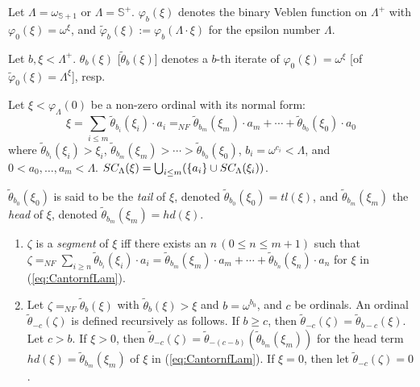 \documentclass{article}
\newcommand{\mS}{\mathbb{S}}
\begin{document}
\bdf\label{df:Lam}
{\rm
Let $\Lambda=\omega_{\mathbb{S}+1}$
or $\Lambda=\mS^{+}$.
$\varphi_{b}(\xi)$ denotes the binary Veblen function on 
$\Lambda^{+}$ with $\varphi_{0}(\xi)=\omega^{\xi}$, and
$\tilde{\varphi}_{b}(\xi):=\varphi_{b}(\Lambda\cdot \xi)$ for the epsilon number 
$\Lambda$.


Let $b,\xi<\Lambda^{+}$.
$\theta_{b}(\xi)$ [$\tilde{\theta}_{b}(\xi)$] denotes
a $b$-th iterate of $\varphi_{0}(\xi)=\omega^{\xi}$ [of $\tilde{\varphi}_{0}(\xi)=\Lambda^{\xi}$], resp.
}
\edf





\bdf\label{df:Lam2}
{\rm
Let $\xi<\varphi_{\Lambda}(0)$ be a non-zero ordinal with its normal form:
\begin{equation}\label{eq:CantornfLam}
\xi=\sum_{i\leq m}\tilde{\theta}_{b_{i}}(\xi_{i})\cdot a_{i}=_{NF}
\tilde{\theta}_{b_{m}}(\xi_{m})\cdot a_{m}+\cdots+\tilde{\theta}_{b_{0}}(\xi_{0})\cdot a_{0}
\end{equation}
where
$\tilde{\theta}_{b_{i}}(\xi_{i})>\xi_{i}$,
$\tilde{\theta}_{b_{m}}(\xi_{m})>\cdots>\tilde{\theta}_{b_{0}}(\xi_{0})$, 
$b_{i}=\omega^{c_{i}}<\Lambda$, and
$0<a_{0},\ldots,a_{m}<\Lambda$.
$SC_{\Lambda}(\xi)=\bigcup_{i\leq m}(\{a_{i}\}\cup SC_{\Lambda}(\xi_{i}))$.

$\tilde{\theta}_{b_{0}}(\xi_{0})$ is said to be the \textit{tail} of $\xi$, denoted 
$\tilde{\theta}_{b_{0}}(\xi_{0})=tl(\xi)$, and
$\tilde{\theta}_{b_{m}}(\xi_{m})$ the \textit{head} of $\xi$, denoted 
$\tilde{\theta}_{b_{m}}(\xi_{m})=hd(\xi)$.



\begin{enumerate}
\item\label{df:Exp2.3}
 $\zeta$ is a \textit{segment} of $\xi$
 iff there exists an $n\, (0\leq n\leq m+1)$
 such that
 $\zeta=_{NF}\sum_{i\geq n}\tilde{\theta}_{b_{i}}(\xi_{i})\cdot a_{i}=
 \tilde{\theta}_{b_{m}}(\xi_{m})\cdot a_{m}+\cdots+\tilde{\theta}_{b_{n}}(\xi_{n})\cdot a_{n}$
 for $\xi$ in (\ref{eq:CantornfLam}).


 
\item\label{df:thtminus}
Let $\zeta=_{NF}\tilde{\theta}_{b}(\xi)$ with $\tilde{\theta}_{b}(\xi)>\xi$ and $b=\omega^{b_{0}}$,
and $c$ be ordinals.
An ordinal $\tilde{\theta}_{-c}(\zeta)$ is defined recursively as follows.
If $b\geq c$, then $\tilde{\theta}_{-c}(\zeta)=\tilde{\theta}_{b-c}(\xi)$.
Let $c>b$.
If $\xi>0$, then
$\tilde{\theta}_{-c}(\zeta)=\tilde{\theta}_{-(c-b)}(\tilde{\theta}_{b_{m}}(\xi_{m}))$ for the head term 
$hd(\xi)=\tilde{\theta}_{b_{m}}(\xi_{m})$ of 
$\xi$ in (\ref{eq:CantornfLam}).
If $\xi=0$, then let $\tilde{\theta}_{-c}(\zeta)=0$.

\end{enumerate}
}
\edf
\end{document}
